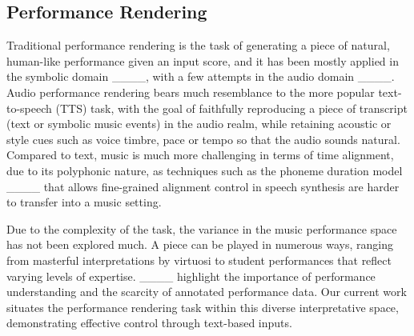 \subsection{Performance Rendering}

Traditional performance rendering is the task of generating a piece of natural, human-like performance given an input score, and it has been mostly applied in the symbolic domain ____, with a few attempts in the audio domain ____. 
Audio performance rendering bears much resemblance to the more popular text-to-speech (TTS) task, with the goal of faithfully reproducing a piece of transcript (text or symbolic music events) in the audio realm, while retaining acoustic or style cues such as voice timbre, pace or tempo so that the audio sounds natural. Compared to text, music is much more challenging in terms of time alignment, due to its polyphonic nature, as techniques such as the phoneme duration model ____ that allows fine-grained alignment control in speech synthesis are harder to transfer into a music setting. 

Due to the complexity of the task, the variance in the music performance space has not been explored much. A piece can be played in numerous ways, ranging from masterful interpretations by virtuosi to student performances that reflect varying levels of expertise. ____  highlight the importance of performance understanding and the scarcity of annotated performance data.  Our current work situates the performance rendering task within this diverse interpretative space, demonstrating effective control through text-based inputs.

